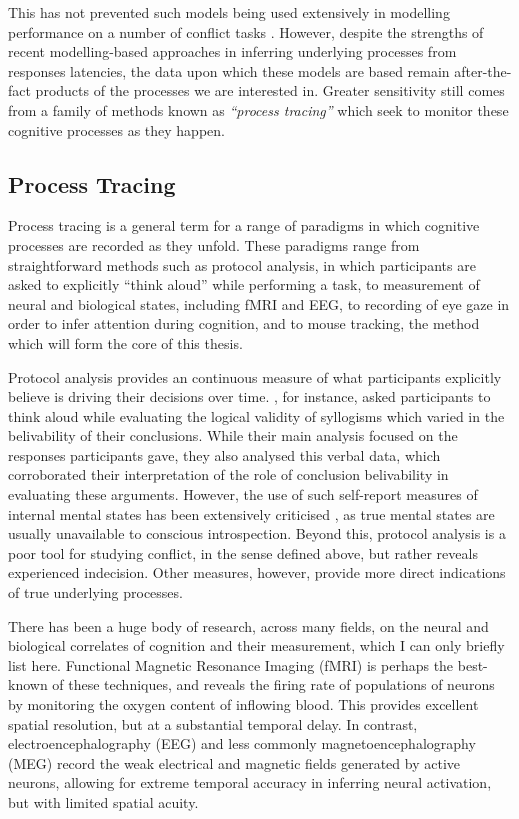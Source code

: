 This has not prevented such models being used extensively in
modelling performance on a number of conflict tasks \citep[see][]{Servant2014}.
However, despite the strengths of recent modelling-based approaches
in inferring underlying processes from responses latencies,
the data upon which these models are based
remain after-the-fact products of the processes we are interested in.
Greater sensitivity still comes from a family of methods
known as \emph{``process tracing''} which seek to monitor
these cognitive processes as they happen.


\subsection{Process Tracing}\label{process-tracing}


Process tracing is a general term for a range of paradigms
in which cognitive processes are recorded as they unfold.
These paradigms range from straightforward methods
such as protocol analysis, in which
participants are asked to explicitly ``think aloud'' while performing a task,
to measurement of neural and biological states, including fMRI and EEG,
to recording of eye gaze in order to infer attention during cognition,
and to mouse tracking, the method which will form the core of this thesis.

Protocol analysis %
provides an continuous measure of
what participants explicitly believe is driving their decisions over time.
\citet{Evans1983}, for instance, asked participants to think aloud
while evaluating the logical validity of syllogisms
which varied in the belivability of their conclusions.
While their main analysis focused on the responses participants gave,
they also analysed this verbal data,
which corroborated their interpretation of the role of conclusion belivability
in evaluating these arguments.
However, the use of such self-report measures of internal mental states
has been extensively criticised \citep[i.e.][]{Nisbett1977}, %
as true mental states are usually unavailable to conscious introspection.
Beyond this, protocol analysis is a poor tool for studying conflict,
in the sense defined above, but rather reveals experienced indecision.
Other measures, however, provide more direct indications
of true underlying processes.


There has been a huge body of research, across many fields,
on the neural and biological correlates of cognition and their measurement,
which I can only briefly list here.
Functional Magnetic Resonance Imaging (fMRI)
is perhaps the best-known of these techniques,
and reveals the firing rate of populations of neurons
by monitoring the oxygen content of inflowing blood.
This provides excellent spatial resolution,
but at a substantial temporal delay.
In contrast, electroencephalography (EEG)
and less commonly magnetoencephalography (MEG)
record the weak electrical and magnetic fields generated by active neurons,
allowing for extreme temporal accuracy in inferring neural activation,
but with limited spatial acuity.

